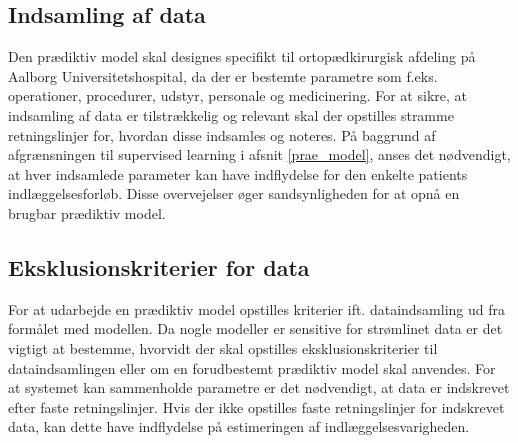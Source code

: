 \subsection{Indsamling af data}
Den prædiktiv model skal designes specifikt til ortopædkirurgisk afdeling på Aalborg Universitetshospital, da der er bestemte parametre som f.eks. operationer, procedurer, udstyr, personale og medicinering. For at sikre, at indsamling af data er tilstrækkelig og relevant skal der opstilles stramme retningslinjer for, hvordan disse indsamles og noteres. På baggrund af afgrænsningen til supervised learning i afsnit \ref{prae_model}, anses det nødvendigt, at hver indsamlede parameter kan have indflydelse for den enkelte patients indlæggelsesforløb. Disse overvejelser øger sandsynligheden for at opnå en brugbar prædiktiv model. 




%


\subsection{Eksklusionskriterier for data} 
For at udarbejde en prædiktiv model opstilles kriterier ift. dataindsamling ud fra formålet med modellen. Da nogle modeller er sensitive for strømlinet data er det vigtigt at bestemme, hvorvidt der skal opstilles eksklusionskriterier til dataindsamlingen eller om en forudbestemt prædiktiv model skal anvendes.\cite{Kuhn2013}
For at systemet kan sammenholde parametre er det nødvendigt, at data er indskrevet efter faste retningslinjer. Hvis der ikke opstilles faste retningslinjer for indskrevet data, kan dette have indflydelse på estimeringen af indlæggelsesvarigheden.\cite{Kuhn2013} 

